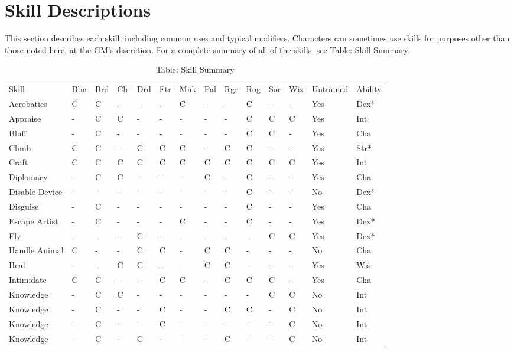 \chapter{Skill Descriptions}

\label{f0}				
This section describes each skill, including common uses and typical modifiers. Characters can sometimes use skills for purposes other than those noted here, at the GM's discretion. For a complete summary of all of the skills, see Table: Skill Summary.

\begin{table}[]
\sffamily
\caption{Table: Skill Summary}
\begin{tabular}{llllllllllllll}
Skill & Bbn & Brd & Clr & Drd & Ftr & Mnk & Pal & Rgr & Rog & Sor & Wiz & Untrained & Ability\\
Acrobatics & C & C & - & - & - & C & - & - & C & - & - & Yes & Dex*\\
Appraise & - & C & C & - & - & - & - & - & C & C & C & Yes & Int\\
Bluff & - & C & - & - & - & - & - & - & C & C & - & Yes & Cha\\
Climb & C & C & - & C & C & C & - & C & C & - & - & Yes & Str*\\
Craft & C & C & C & C & C & C & C & C & C & C & C & Yes & Int\\
Diplomacy & - & C & C & - & - & - & C & - & C & - & - & Yes & Cha\\
Disable Device & - & - & - & - & - & - & - & - & C & - & - & No & Dex*\\
Disguise & - & C & - & - & - & - & - & - & C & - & - & Yes & Cha\\
Escape Artist & - & C & - & - & - & C & - & - & C & - & - & Yes & Dex*\\
Fly & - & - & - & C & - & - & - & - & - & C & C & Yes & Dex*\\
Handle Animal & C & - & - & C & C & - & C & C & - & - & - & No & Cha\\
Heal & - & - & C & C & - & - & C & C & - & - & - & Yes & Wis\\
Intimidate & C & C & - & - & C & C & - & C & C & C & - & Yes & Cha\\
Knowledge & - & C & C & - & - & - & - & - & - & C & C & No & Int\\
Knowledge & - & C & - & - & C & - & - & C & C & - & C & No & Int\\
Knowledge & - & C & - & - & C & - & - & - & - & - & C & No & Int\\
Knowledge & - & C & - & C & - & - & - & C & - & - & C & No & Int\\

\end{tabular}
\end{table}
